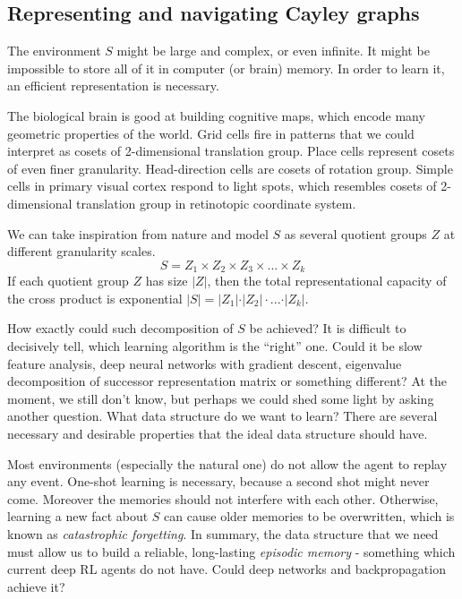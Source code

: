 \documentclass[12pt]{article}
\begin{document}
\subsection{Representing and navigating Cayley graphs}

The environment $S$ might be large and complex, or even infinite. It might be  impossible to store all of it in computer (or brain) memory. In order to learn it, an efficient representation is necessary. 

The biological brain is good at building cognitive maps, which encode many geometric properties of the world. Grid cells fire in patterns that we could interpret as cosets of 2-dimensional translation group. Place cells represent cosets of even finer granularity. Head-direction cells are cosets of rotation group. Simple cells in primary visual cortex respond to light spots, which resembles cosets of 2-dimensional translation group in retinotopic coordinate system. 

We can take inspiration from nature and model $S$ as several quotient groups $Z$ at different granularity scales. 
\[
S = Z_1 \times Z_2 \times Z_3 \times ... \times Z_k
\]
If each quotient group $Z$ has size $\vert Z \vert$, then the total representational capacity of the cross product is exponential $\vert S\vert = \vert Z_1 \vert  \cdot \vert Z_2 \vert  \cdot ... \cdot \vert Z_k\vert$. 
 
How exactly could such decomposition of $S$ be achieved? It is difficult to decisively tell, which learning algorithm is the ``right'' one. Could it be slow feature analysis, deep neural networks with gradient descent, eigenvalue decomposition of successor representation matrix or something different?  At the moment, we still don't know, but perhaps we could shed some light by asking another question. What data structure do we want to learn? There are several necessary and desirable properties that the ideal data structure should have.

Most environments (especially the natural one) do not allow the agent to replay any event. One-shot learning is necessary, because a second shot might never come.  Moreover the memories should not interfere with each other. Otherwise, learning a new fact about $S$ can cause older memories to be overwritten, which is known as \textit{catastrophic forgetting}. In summary, the data structure that we need must allow us to build a reliable, long-lasting \textit{episodic memory} - something which current deep RL agents do not have. Could deep networks and backpropagation achieve it? 
\end{document}
